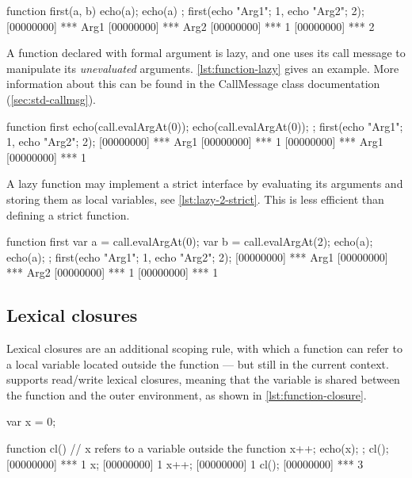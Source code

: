 \begin{urbiscript}[caption=Strict Functions,
  label=lst:us-fun-strict,float=\floatpos]
function first(a, b) {
  echo(a); echo(a)
};
first({echo "Arg1"; 1},
      {echo "Arg2"; 2});
[00000000] *** Arg1
[00000000] *** Arg2
[00000000] *** 1
[00000000] *** 2
\end{urbiscript}

A function declared with formal argument is lazy, and one uses its
call message to manipulate its \emph{unevaluated} arguments.
\autoref{lst:function-lazy} gives an example.  More information about
this can be found in the CallMessage class documentation
(\autoref{sec:std-callmsg}).

\begin{urbiscript}[caption=Lazy
  function,label=lst:function-lazy,float=\floatposh]
function first
{
  echo(call.evalArgAt(0));
  echo(call.evalArgAt(0));
};
first({echo "Arg1"; 1},
      {echo "Arg2"; 2});
[00000000] *** Arg1
[00000000] *** 1
[00000000] *** Arg1
[00000000] *** 1
\end{urbiscript}

A lazy function may implement a strict interface by evaluating its
arguments and storing them as local variables, see
\autoref{lst:lazy-2-strict}.  This is less efficient than defining a
strict function.

\begin{urbiscript}[caption=Lazy functions with strict semantics,
  label=lst:lazy-2-strict,float=\floatposh]
function first
{
  var a = call.evalArgAt(0);
  var b = call.evalArgAt(2);
  echo(a); echo(a);
};
first({echo "Arg1"; 1},
      {echo "Arg2"; 2});
[00000000] *** Arg1
[00000000] *** Arg2
[00000000] *** 1
[00000000] *** 1
\end{urbiscript}

\subsection{Lexical closures}
\label{sec:us-fun-closures}

Lexical closures are an additional scoping rule, with which a function
can refer to a local variable located outside the function --- but still
in the current context. \us supports read/write lexical closures,
meaning that the variable is shared between the function and the outer
environment, as shown in \autoref{lst:function-closure}.

\begin{urbiscript}[caption=Lexical
  closure,label=lst:function-closure,float=\floatpos]
  var x = 0;

  function cl()
  {
    // x refers to a variable outside the function
    x++;
    echo(x);
  };
  cl();
  [00000000] *** 1
  x;
  [00000000] 1
  x++;
  [00000000] 1
  cl();
  [00000000] *** 3
\end{urbiscript}


